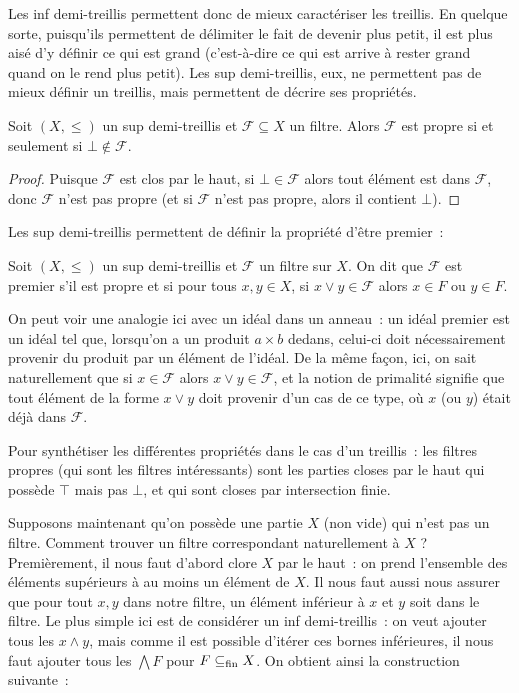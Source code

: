Les inf demi-treillis permettent donc de mieux caractériser les treillis. En
quelque sorte, puisqu'ils permettent de délimiter le fait de devenir plus petit,
il est plus aisé d'y définir ce qui est grand (c'est-à-dire ce qui est arrive à
rester grand quand on le rend plus petit). Les sup demi-treillis, eux, ne
permettent pas de mieux définir un treillis, mais permettent de décrire ses
propriétés.

\begin{property}
  Soit $(X,\leq)$ un sup demi-treillis et $\mathcal F \subseteq X$ un filtre.
  Alors $\mathcal F$ est propre si et seulement si $\bot\notin\mathcal F$.
\end{property}

\begin{proof}
  Puisque $\mathcal F$ est clos par le haut, si $\bot\in\mathcal F$ alors tout
  élément est dans $\mathcal F$, donc $\mathcal F$ n'est pas propre (et si
  $\mathcal F$ n'est pas propre, alors il contient $\bot$).
\end{proof}

Les sup demi-treillis permettent de définir la propriété d'être premier~:

\begin{definition}
  Soit $(X,\leq)$ un sup demi-treillis et $\mathcal F$ un filtre sur $X$. On dit
  que $\mathcal F$ est premier s'il est propre et si pour tous $x,y\in X$, si
  $x\lor y \in \mathcal F$ alors $x\in F$ ou $y\in F$.
\end{definition}

On peut voir une analogie ici avec un idéal dans un anneau~: un idéal premier
est un idéal tel que, lorsqu'on a un produit $a\times b$ dedans, celui-ci doit
nécessairement provenir du produit par un élément de l'idéal. De la même façon,
ici, on sait naturellement que si $x\in\mathcal F$ alors
$x\lor y \in\mathcal F$, et la notion de primalité signifie que tout élément de
la forme $x\lor y$ doit provenir d'un cas de ce type, où $x$ (ou $y$) était déjà
dans $\mathcal F$.

Pour synthétiser les différentes propriétés dans le cas d'un treillis~: les
filtres propres (qui sont les filtres intéressants) sont les parties closes par
le haut qui possède $\top$ mais pas $\bot$, et qui sont closes par intersection
finie.

Supposons maintenant qu'on possède une partie $X$ (non vide) qui n'est pas un
filtre. Comment trouver un filtre correspondant naturellement à $X$ ?
Premièrement, il nous faut d'abord clore $X$ par le haut~: on prend l'ensemble
des éléments supérieurs à au moins un élément de $X$. Il nous faut aussi nous
assurer que pour tout $x,y$ dans notre filtre, un élément inférieur à $x$ et $y$
soit dans le filtre. Le plus simple ici est de considérer un inf demi-treillis~:
on veut ajouter tous les $x\land y$, mais comme il est possible d'itérer ces
bornes inférieures, il nous faut ajouter tous les $\bigwedge F$ pour
$F\subseteq_{\mathrm{fin}} X$. On obtient ainsi la construction suivante~:

